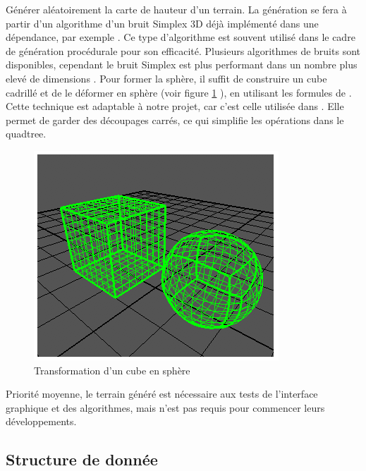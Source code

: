 \documentclass[12pt]{report}
\begin{document}
Générer aléatoirement la carte de hauteur d'un terrain.  La génération
se fera à partir d'un algorithme d'un bruit Simplex 3D déjà implémenté
dans une dépendance, par exemple \cite{libnoise}. Ce type d'algorithme
est souvent utilisé dans le cadre de génération procédurale pour son
efficacité. Plusieurs algorithmes de bruits sont disponibles, cependant
le bruit Simplex est plus performant dans un nombre plus elevé de
dimensions \cite{Simplexnoise}.  Pour former la sphère, il suffit de
construire un cube cadrillé et de le déformer en sphère (voir figure \ref{fig:Cubetosphere} ), en utilisant
les formules de \cite{Cube2Sphere}. Cette technique est adaptable à
notre projet, car c'est celle utilisée dans \cite{WorldGenerator}. Elle
permet de garder des découpages carrés, ce qui simplifie les opérations
dans le quadtree.\\

\begin{center}
\begin{figure}[!h]
  \includegraphics[scale=1]{img/Cubetosphere.png}
  \caption{Transformation d'un cube en sphère \cite{Cube2Sphere}}
  \label{fig:Cubetosphere}
\end{figure}
\end{center}

Priorité moyenne, le terrain généré est nécessaire aux tests de
l'interface graphique et des algorithmes, mais n'est pas requis pour
commencer leurs développements.\\


\subsection{Structure de donnée}
\end{document}
